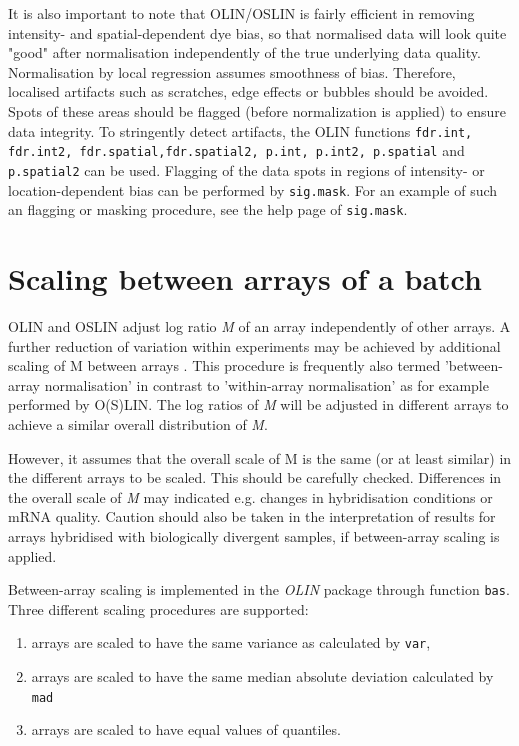 \documentclass[a4paper,11pt]{article}
\begin{document}
It is also important to note that OLIN/OSLIN is fairly efficient in removing intensity- and spatial-dependent dye bias, so that normalised  data will look quite "good" after normalisation independently of the true underlying data quality. Normalisation by local regression assumes smoothness of bias. Therefore, localised artifacts such as scratches, edge effects or bubbles should be avoided. Spots of these areas should be flagged (before normalization is applied) to ensure data integrity. To stringently detect artifacts, the OLIN functions \texttt{fdr.int, fdr.int2, fdr.spatial,fdr.spatial2, 
p.int, p.int2, p.spatial} and \texttt{p.spatial2} can be used. 
Flagging of the data spots in regions of intensity- or location-dependent bias can be performed 
by \texttt{sig.mask}. For an example of such an flagging or masking procedure, 
see the help page of \texttt{sig.mask}.


\section{Scaling between arrays of a batch}
OLIN and OSLIN adjust log ratio \emph{M} of an array independently of other arrays.
A further reduction  of variation within experiments may be achieved by
additional scaling of M between arrays \cite{yang}. This procedure is frequently
also termed 'between-array normalisation' in contrast to 'within-array normalisation'
as for example performed by O(S)LIN. The log ratios of \emph{M} will be adjusted in different
arrays to achieve a similar overall distribution of \emph{M}.

However, it assumes that the overall scale of M is the same (or at least similar)
in the different arrays to be scaled. This should be  carefully checked. Differences in the 
overall scale of \emph{M} may indicated e.g. changes in hybridisation conditions or mRNA quality.
Caution should also be taken in the interpretation of results for arrays
hybridised with  biologically divergent samples, if between-array  scaling is applied.


Between-array scaling is implemented in the \emph{OLIN} package through function \texttt{bas}.
Three different scaling procedures are supported: 
\begin{enumerate}
\item  arrays are scaled to have the same variance as calculated by
\texttt{var},
\item  arrays are scaled to have the same median absolute deviation calculated by \texttt{mad}
\item arrays are scaled to have  equal values of quantiles. 
\end{enumerate}
\end{document}
